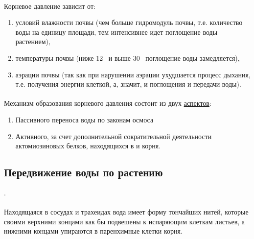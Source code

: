 \paragraph*{}Корневое давление зависит от:

\begin{enumerate}

	\item условий влажности почвы (чем больше гидромодуль почвы, т.е. количество воды на единицу площади, тем интенсивнее идет поглощение воды растением),
	\item температуры почвы (ниже 12 \celsius ~и выше 30 \celsius ~поглощение воды замедляется),
	\item аэрации почвы (так как при нарушении аэрации ухудшается процесс дыхания, т.е. получения энергии клеткой, а, значит, и поглощения и передачи воды).

\end{enumerate}

\paragraph*{}Механизм образования корневого давления состоит из двух \hyperlink{question_whater_trans}{аспектов}:

\begin{enumerate}

\item Пассивного переноса воды по законам осмоса
\item Активного, за счет дополнительной сократительной деятельности актомиозиновых белков, находящихся в  и  корня.

\end{enumerate}

\subsection*{Передвижение воды по растению}

.

\paragraph*{}Находящаяся в сосудах и трахеидах вода имеет форму тончайших нитей, которые своими верхними концами как бы подвешены к испаряющим клеткам листьев, а нижними концами упираются в паренхимные клетки корня.

